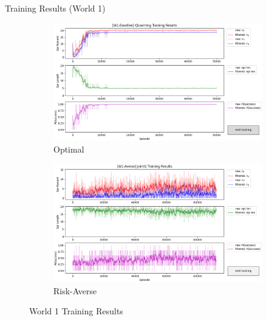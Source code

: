 \documentclass[aspectratio=1610, xcolor=dvipsnames]{packages/beamer}
\begin{document}
\begin{frame}{Training Results (World 1)}
     \begin{figure}
     \centering
          \begin{subfigure}[b]{\Wfig\textwidth}  \centering
              \includegraphics[width=\textwidth]{../results/IDQN_W1/Fig_W1_JointQ_Baseline}
              \caption{Optimal} \label{fig:W1baseline}
          \end{subfigure}
          \hfill
         \begin{subfigure}[b]{\Wfig\textwidth} \centering
             \includegraphics[width=\textwidth]{../results/IDQN_W1/Fig_W1_JointQ_Averse}
             \caption{Risk-Averse} \label{fig:W1averse}
         \end{subfigure}
    \caption{World 1 Training Results}
    \label{fig:W1}
    \end{figure}
\end{frame}
\end{document}
